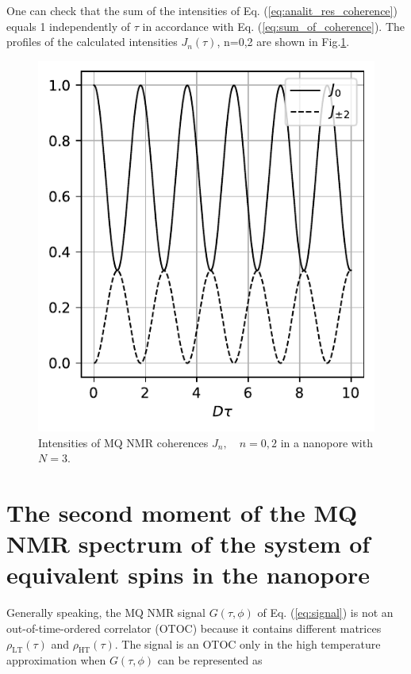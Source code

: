\documentclass[
    pra,  
    twocolumn, 
    floatfix, 
    amsmath, 
    amssymb, 
    superscriptaddress
]{revtex4-1}
\begin{document}
One can check that the sum of the intensities of Eq.   (\ref{eq:analit_res_coherence}) equals 1 independently of $\tau$ in accordance with Eq.   (\ref{eq:sum_of_coherence}). The profiles of the calculated intensities $J_n(\tau)$, n=0,2 are shown in Fig.\ref{fig:exact_j}.
\begin{figure}
    \centering
    \includegraphics{exact_j.pdf}
    \caption{Intensities of MQ NMR coherences $J_n, \quad n=0, 2$ in a nanopore with $N = 3$.}
    \label{fig:exact_j}
\end{figure}


\section{The second moment of the MQ NMR spectrum of the system of equivalent spins in the nanopore}
\label{sec:second_moment}

Generally speaking, the MQ NMR signal $G(\tau, \phi)$ of Eq. (\ref{eq:signal}) is not an out-of-time-ordered correlator (OTOC) \cite{otoc_to_enanglement_via_mqcoh} because it contains different matrices $\rho_\mathrm{LT}(\tau)$ and $\rho_\mathrm{HT}(\tau)$. The signal is an OTOC only in the high temperature approximation when $G(\tau, \phi)$ can be represented as
\end{document}
